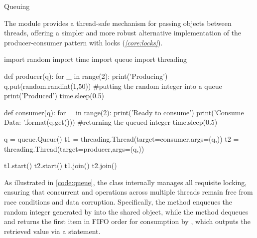 \documentclass[10pt]{article}
\begin{document}
      \begin{core}{Queuing}

        The  module provides a thread-safe mechanism for passing objects between threads, offering a simpler and more robust alternative implementation of the producer-consumer pattern with locks (\textit{\autoref{core:locks}}).

        \begin{pyconsole}

          import random
          import time
          import queue
          import threading

          def producer(q):
              for _ in range(2):
                  print('Producing')
                  q.put(random.randint(1,50)) #putting the random integer into a queue
                  print('Produced')
                  time.sleep(0.5)

          def consumer(q):
              for _ in range(2):
                  print('Ready to consume')
                  print('Consume Data: {}'.format(q.get())) #returning the queued integer
                  time.sleep(0.5)

          q = queue.Queue()
          t1 = threading.Thread(target=consumer,args=(q,))
          t2 = threading.Thread(target=producer,args=(q,))

          t1.start()
          t2.start()
          t1.join()
          t2.join()

        \end{pyconsole}

        As illustrated in \autoref{code:queue}, the  class internally manages all requisite locking, ensuring that concurrent  and  operations across multiple threads remain free from race conditions and data corruption. Specifically, the  method enqueues the random integer generated by  into the shared  object, while the  method dequeues and returns the first item in FIFO order for consumption by , which outputs the retrieved value via a  statement.

      \end{core}
\end{document}
